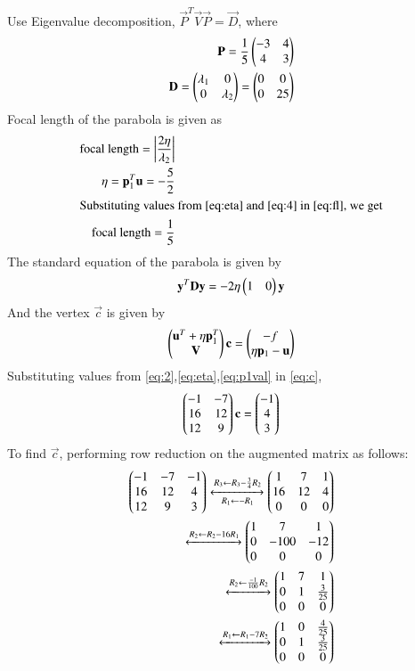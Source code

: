 \documentclass[journal,12pt,twocolumn]{IEEEtran}
\begin{document}
Use Eigenvalue decomposition, $\vec{P}^T\vec{V}\vec{P}=\vec{D}$, where
\begin{align}
    \mathbf{P} = \frac{1}{5}\begin{pmatrix}-3 & 4\\4 & 3\end{pmatrix}\\
    \mathbf{D} = \begin{pmatrix}\lambda_1 & 0\\0 & \lambda_2\end{pmatrix} = \begin{pmatrix}0 & 0\\ 0 & 25\end{pmatrix}
\end{align}
Focal length of the parabola is given as
\begin{align}
    \text{focal length} = \left\vert\frac{2\eta}{\lambda_2}\right\vert\label{eq:fl}\\
    \eta = \mathbf{p}_1^T\mathbf{u} = -\frac{5}{2}\label{eq:eta}\\
    \intertext{Substituting values from \eqref{eq:eta} and \eqref{eq:4} in \eqref{eq:fl}, we get}
    \text{focal length} = \frac{1}{5}
\end{align}
The standard equation of the parabola is given by
\begin{align}
    \mathbf{y}^T\mathbf{D}\mathbf{y} = -2\eta\begin{pmatrix}1 & 0\end{pmatrix}\mathbf{y}
\end{align}
And the vertex $\vec{c}$ is given by
\begin{align}
    \begin{pmatrix}\mathbf{u}^T + \eta\mathbf{p}_1^T \\ \mathbf{V}\end{pmatrix}\mathbf{c} = \begin{pmatrix}-f \\ \eta\mathbf{p}_1 - \mathbf{u}\end{pmatrix} \label{eq:c}
\end{align}
Substituting values from \eqref{eq:2},\eqref{eq:eta},\eqref{eq:p1val} in \eqref{eq:c},
\begin{align}
    \begin{pmatrix}-1 & -7\\16 & 12\\12 & 9\end{pmatrix}\mathbf{c} = \begin{pmatrix}-1\\4\\3\end{pmatrix}
\end{align}
To find $\vec{c}$, performing row reduction on the augmented matrix as follows:
\begin{align}
    \begin{pmatrix}-1 & -7 & -1\\16 & 12 & 4\\12 & 9 & 3\end{pmatrix}\xleftrightarrow[R_1\leftarrow -R_1]{R_3\leftarrow R_3-\frac{3}{4}R_2}\begin{pmatrix}1 & 7 & 1\\16 & 12 & 4\\0&0&0\end{pmatrix}\\
    \xleftrightarrow{R_2\leftarrow R_2-16R_1}\begin{pmatrix}1 & 7 & 1\\0 & -100 & -12\\0&0&0\end{pmatrix}\\\xleftrightarrow{R_2\leftarrow \frac{-1}{100}R_2}\begin{pmatrix}1 & 7 & 1\\0 & 1 & \frac{3}{25}\\0&0&0\end{pmatrix}\\\xleftrightarrow{R_1\leftarrow R_1-7R_2}\begin{pmatrix}1 & 0 & \frac{4}{25}\\0 & 1 & \frac{3}{25}\\0&0&0\end{pmatrix}
\end{align}
\end{document}
